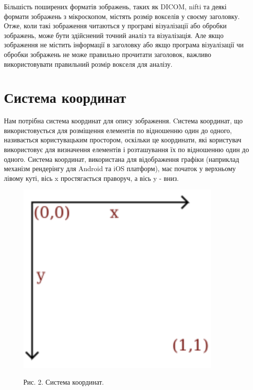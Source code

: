 \documentclass[a4paper,12pt]{article}
\begin{document}
    Більшість поширених форматів зображень, таких як DICOM, nifti та деякі формати зображень з мікроскопом, містять розмір вокселів у своєму заголовку.
    Отже, коли такі зображення читаються у програмі візуалізації або обробки зображень, може бути здійснений точний аналіз та візуалізація.
    Але якщо зображення не містить інформації в заголовку або якщо програма візуалізації чи обробки зображень не може правильно прочитати заголовок, важливо використовувати правильний розмір вокселя для аналізу.


    \section{Система координат}\label{sec:coordinate_system}
    Нам потрібна система координат для опису зображення.
    Cистема координат, що використовується для розміщення елементів по відношенню один до одного, називається користувацьким простором, оскільки це координати, які користувач використовує для визначення елементів і розташування їх по відношенню один до одного.
    Система координат, використана для відображення графіки (наприклад механізм рендерінгу для Android та iOS платформ), має початок у верхньому лівому куті, вісь x простягається праворуч, а вісь y - вниз.

    \begin{figure}
        \label{fig:image2}
        \centering
        \includegraphics[scale=0.5]{image2.png}

        Рис. 2. Система координат.
    \end{figure}

    \pagebreak
\end{document}
